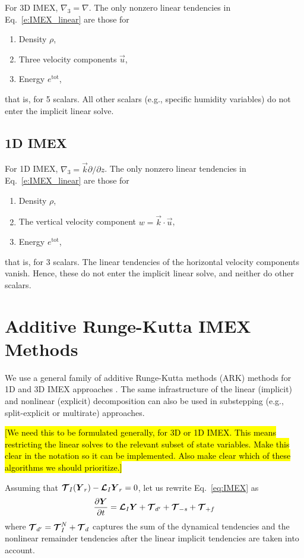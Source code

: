 \documentclass{report}
\begin{document}
For 3D IMEX, $\nabla_{3} = \nabla$. The only nonzero linear tendencies in Eq.~\eqref{e:IMEX_linear} are those for 
\begin{enumerate}
    \item Density $\rho$,
    \item Three velocity components $\vec{u}$,
    \item Energy $e^{\mathrm{tot}}$,
\end{enumerate}
that is, for 5 scalars. All other scalars (e.g., specific humidity variables) do not enter the implicit linear solve. 

\subsection{1D IMEX}

For 1D IMEX, $\nabla_{3} = \vec{k} \partial/\partial z$. The only nonzero linear tendencies in Eq.~\eqref{e:IMEX_linear} are those for 
\begin{enumerate}
    \item Density $\rho$,
    \item The vertical velocity component $w = \vec{k} \cdot \vec{u}$,
    \item Energy $e^{\mathrm{tot}}$,
\end{enumerate}
that is, for 3 scalars. The linear tendencies of the horizontal velocity components vanish. Hence, these do not enter the implicit linear solve, and neither do other scalars. 

\section{Additive Runge-Kutta IMEX Methods}

We use a general family of additive Runge-Kutta methods (ARK) methods for 1D and 3D IMEX approaches \citep[see, e.g.,][]{giraldo:2013,Weller13a,Gardner18a}. The same infrastructure of the linear (implicit) and nonlinear (explicit) decomposition can also be used in substepping (e.g., split-explicit or multirate) approaches.

\hl{[We need this to be formulated generally, for 3D or 1D IMEX. This means restricting the linear solves to the relevant subset of state variables. Make this clear in the notation so it can be implemented. Also make clear which of these algorithms we should prioritize.]}

Assuming that $\boldsymbol{{\mathcal{T}}}_I(\boldsymbol{{Y}}_r) - \boldsymbol{{\mathcal{L}}}_I \boldsymbol{{Y}}_r=0$, let us
rewrite Eq.~\eqref{eq:IMEX} as
\begin{equation}
\label{eq:IMEX_v3}
\frac{\partial\boldsymbol{{Y}}}{\partial t} =  \boldsymbol{{\mathcal{L}}}_I \boldsymbol{{Y}} + \boldsymbol{{\mathcal{T}}}_{d'} + \boldsymbol{{\mathcal{T}}}_{-s} + \boldsymbol{{\mathcal{T}}}_{+f}
\end{equation}
where $\boldsymbol{{\mathcal{T}}}_{d'}=\boldsymbol{{\mathcal{T}}}^N_{I} + \boldsymbol{{\mathcal{T}}}_{d}$ captures the sum of the dynamical tendencies and the nonlinear remainder tendencies after the linear implicit tendencies are taken into account.  
\end{document}
